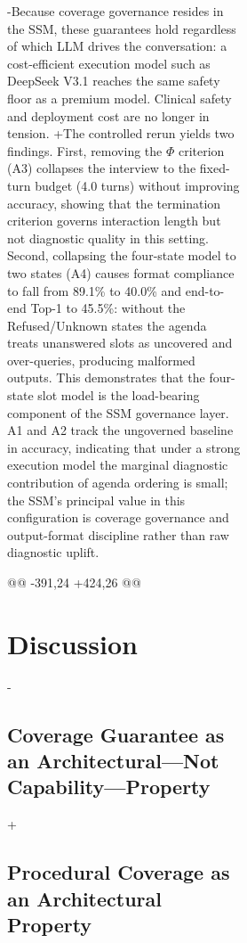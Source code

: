 \begin{figure}[t]
{\begin{figure}[!t]
{\begin{figure}[!t]
{-Because coverage governance resides in the SSM, these guarantees hold regardless of which LLM drives the conversation: a cost-efficient execution model such as DeepSeek V3.1 reaches the same safety floor as a premium model. Clinical safety and deployment cost are no longer in tension.
+The controlled rerun yields two findings. First, removing the $\Phi$ criterion (A3) collapses the interview to the fixed-turn budget (4.0 turns) without improving accuracy, showing that the termination criterion governs interaction length but not diagnostic quality in this setting. Second, collapsing the four-state model to two states (A4) causes format compliance to fall from 89.1\% to 40.0\% and end-to-end Top-1 to 45.5\%: without the Refused/Unknown states the agenda treats unanswered slots as uncovered and over-queries, producing malformed outputs. This demonstrates that the four-state slot model is the load-bearing component of the SSM governance layer. A1 and A2 track the ungoverned baseline in accuracy, indicating that under a strong execution model the marginal diagnostic contribution of agenda ordering is small; the SSM's principal value in this configuration is coverage governance and output-format discipline rather than raw diagnostic uplift.
 
 
 
@@ -391,24 +424,26 @@
 \section{Discussion}
 
-\subsection{Coverage Guarantee as an Architectural—Not Capability—Property}
+\subsection{Procedural Coverage as an Architectural Property}
 
}
\end{figure}}
\end{figure}}
\end{figure}
